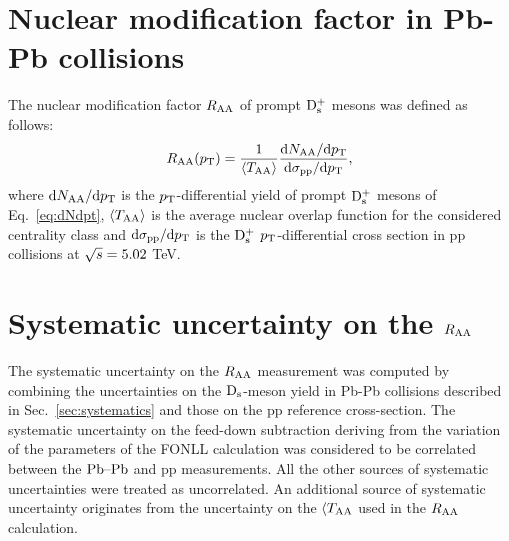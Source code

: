 \section{Nuclear modification factor in Pb-Pb collisions}
\label{sec:RAA}
The nuclear modification factor $R_{\rm AA}$ of prompt ${\rm D_s^+}$ mesons was defined as follows:
\begin{equation}
\label{eq:RAADs}
R_{\rm AA} (p_{\rm T}) = \frac{1}{\langle T_{\rm AA} \rangle} \frac{{\rm d} N_{\rm AA}/{\rm d}p_{\rm T}}{{\rm d} \sigma_{\rm pp}/{\rm d} p_{\rm T}},
\end{equation}
where ${\rm d} N_{\rm AA}/{\rm d}p_{\rm T}$ is the $p_{\rm T}$-differential yield of prompt ${\rm D_s^+}$ mesons
of Eq.~\ref{eq:dNdpt}, $\langle T_{\rm AA} \rangle$ is the 
average nuclear overlap function for the considered centrality class and ${\rm d} \sigma_{\rm pp}/{\rm d} p_{\rm T}$ is 
the ${\rm D_s^+}$ $p_{\rm T}$-differential cross section in pp collisions at $\sqrt{s} = 5.02$ TeV.
\section{Systematic uncertainty on the $R_{\rm AA}$}
\label{sec:SystRAA}
The systematic uncertainty on the $R_{\rm AA}$ measurement was computed by combining the uncertainties  
on the ${\rm D_s}$-meson yield in Pb-Pb collisions described in Sec.~\ref{sec:systematics} and those 
on the pp reference cross-section. The systematic 
uncertainty on the feed-down subtraction deriving from
the variation of the parameters of the FONLL calculation was considered to be
correlated between the $\mbox{Pb--Pb}$ and pp measurements. All the 
other sources of systematic uncertainties were treated as uncorrelated. 
An additional source of systematic uncertainty originates from the uncertainty
on the $\langle T_{\rm AA}$ used in the $R_{\rm AA}$ calculation.

